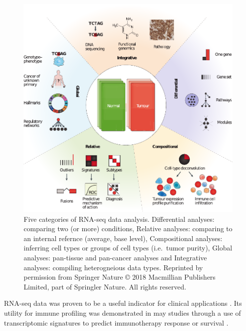 \documentclass[12pt,]{book}
\theoremstyle{definition}
\theoremstyle{definition}
\theoremstyle{definition}
\theoremstyle{remark}
\begin{document}
\begin{figure}

{\centering \includegraphics[width=1\linewidth]{figures-ext/transcriptome-methods} 

}

\caption{Five categories of RNA-seq data
analysis. Differential analyses: comparing two (or more) conditions,
Relative analyses: comparing to an internal refernce (average, base
level), Compositional analyses: inferring cell types or groups of cell
types (i.e.~tumor purity), Global analyses: pan-tissue and pan-cancer
analyses and Integrative analyses: compiling heterogneious data types.
Reprinted by permission from Springer Nature \citep{Cieslik2017} © 2018
Macmillian Publishers Limited, part of Springler Nature. All rights
reserved.}\label{fig:transcriptome-methods}
\end{figure}











RNA-seq data was proven to be a useful indicator for clinical
applications \citep{Mody2015, Oberg2016, Robinson2017}. Its utility for
immune profiling was demonstrated in may studies through a use of
transcriptomic signatures to predict immunotherapy response or survival
\citep{Chen2016}.
\end{document}
